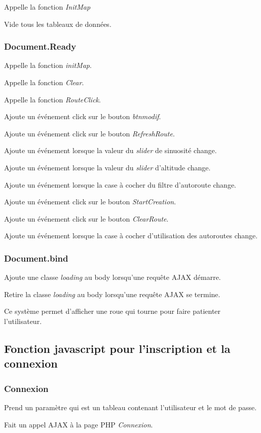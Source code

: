 \documentclass[a4paper]{article}
\begin{document}
Appelle la fonction \emph{InitMap}

Vide tous les tableaux de données.

\subsubsection{Document.Ready}
Appelle la fonction \emph{initMap}.

Appelle la fonction \emph{Clear}.

Appelle la fonction \emph{RouteClick}.

Ajoute un événement click sur le bouton \emph{btnmodif}.

Ajoute un événement click sur le bouton \emph{RefreshRoute}.

Ajoute un événement lorsque la valeur du \emph{slider} de sinuosité change.

Ajoute un événement lorsque la valeur du \emph{slider} d'altitude change.

Ajoute un événement lorsque la case à cocher du filtre d'autoroute change.

Ajoute un événement click sur le bouton \emph{StartCreation}.

Ajoute un événement click sur le bouton \emph{ClearRoute}.

Ajoute un événement lorsque la case à cocher d'utilisation des autoroutes change.

\subsubsection{Document.bind}
Ajoute une classe \emph{loading} au body lorsqu'une requête AJAX démarre.

Retire la classe \emph{loading} au body lorsqu'une requête AJAX se termine.

Ce système permet d'afficher une roue qui tourne pour faire patienter l'utilisateur.

\subsection{Fonction javascript pour l'inscription et la connexion}
\subsubsection{Connexion}
Prend un paramètre qui est un tableau contenant l'utilisateur et le mot de passe.

Fait un appel AJAX à la page PHP \emph{Connexion}.
\end{document}
